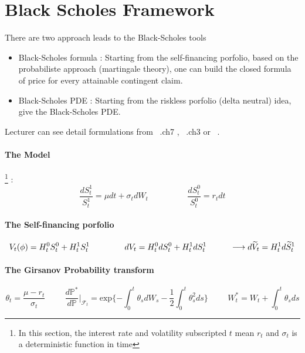 \documentclass[a4paper,10pt]{article}
\begin{document}
\section{Black Scholes Framework}
There are two approach leads to the Black-Scholes tools
\begin{itemize}
 \item Black-Scholes formula : Starting from the self-financing porfolio, based on the probabiliste approach (martingale theory), one can build the closed formula of price for every attainable contingent claim. 
 \item Black-Scholes PDE : Starting from the riskless porfolio (delta neutral) idea, give the Black-Scholes PDE.
\end{itemize}
Lecturer can see detail formulations from ~\cite{ELLIOT}.ch7 , ~\cite{MAREK}.ch3 or ~\cite{rouah}.  
\paragraph{The Model} \footnote{In this section, the interest rate and volatility subscripted $t$ mean $r_t$ and $\sigma_t$ is a deterministic function in time} :
\[
\frac{dS^1_t}{S^1_t} = \mu dt + \sigma_t d W_t   \hspace{2cm} \frac{dS^0_t}{S^0_t} = r_t dt
\]
\paragraph{The Self-financing porfolio} 
\[
V_t(\phi) = H^0_t S^0_t + H^1_t S^1_t   
\hspace{1.5cm} 
dV_t = H^0_t dS^0_t + H^1_t dS^1_t 
\hspace{1cm} \longrightarrow
d\widetilde{V}_t = H^1_t d\widetilde{S}^1_t 
\]
\paragraph{The Girsanov Probability transform}
\[
\theta_t = \frac{\mu - r_t}{\sigma_t} 
\hspace{1cm} 
\frac{d\mathbb{P}^*}{d\mathbb{P}}|_{\mathcal{F}_t} = \text{exp}\{ -\int_0^t \theta_s dW_s - \frac{1}{2} \int_0^t \theta^2_s ds \}
\hspace{1cm} 
W^*_t = W_t + \int_0^t \theta_s ds
\]
\end{document}
